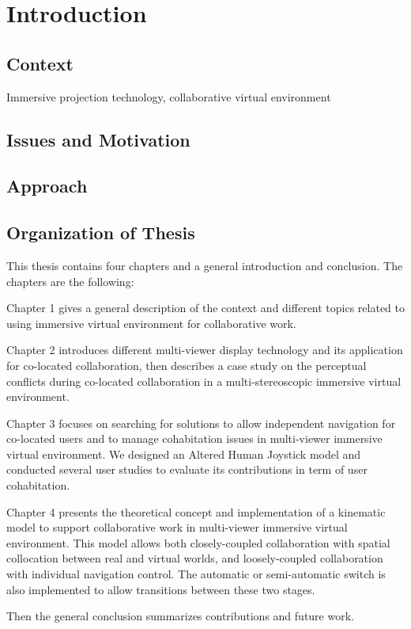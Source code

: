 \chapter*{Introduction}
\mtcaddchapter[Introduction]

\section*{Context}
Immersive projection technology, collaborative virtual environment

\section*{Issues and Motivation}

\section*{Approach}

\section*{Organization of Thesis}
This thesis contains four chapters and a general introduction and conclusion. The chapters are the following:

Chapter 1 gives a general description of the context and different topics related to using immersive virtual environment for collaborative work.

Chapter 2 introduces different multi-viewer display technology and its application for co-located collaboration, then describes a case study on the perceptual conflicts during co-located collaboration in a multi-stereoscopic immersive virtual environment.

Chapter 3 focuses on searching for solutions to allow independent navigation for co-located users and to manage cohabitation issues in multi-viewer immersive virtual environment. We designed an Altered Human Joystick model and conducted several user studies to evaluate its contributions in term of user cohabitation.

Chapter 4 presents the theoretical concept and implementation of a kinematic model to support collaborative work in multi-viewer immersive virtual environment. This model allows both closely-coupled collaboration with spatial collocation between real and virtual worlds, and loosely-coupled collaboration with individual navigation control. The automatic or semi-automatic switch is also implemented to allow transitions between these two stages.

Then the general conclusion summarizes contributions and future work.